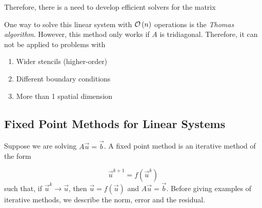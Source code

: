Therefore, there is a need to develop efficient solvers for the matrix

\begin{center}
\end{center}

One way to solve this linear system with $\mathcal{O}\left(n\right)$ operations is the
\emph{Thomas algorithm}. However, this method only works if $A$ is tridiagonal.
Therefore, it can not be applied to problems with
\begin{enumerate}[1)]
\item Wider stencils (higher-order)
\item Different boundary conditions
\item More than 1 spatial dimension
\end{enumerate}

\subsection{Fixed Point Methods for Linear Systems}

Suppose we are solving $A\vec{u}=\vec{b}$. A fixed point method is an iterative
method of the form

\begin{equation*}
\vec{u}^{k+1} = f\left( \vec{u}^k \right)
\end{equation*}
such that, if $\vec{u}^k \rightarrow \vec{u}$, then $\vec{u} = f(\vec{u})$
and $A\vec{u}=\vec{b}$. Before giving examples of iterative methods, we describe
the norm, error and the residual.

